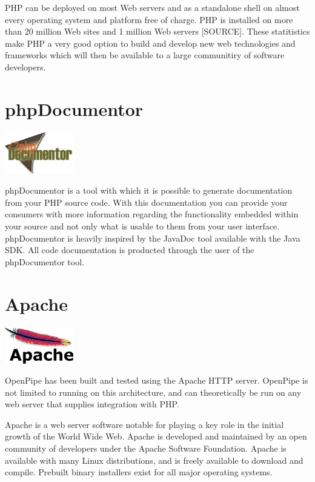 \documentclass[12pt]{report}
\begin{document}
PHP can be deployed on most Web servers and as a standalone shell on almost every operating system and platform free of charge.  PHP is installed on more than 20 million Web sites and 1 million Web servers [SOURCE]. These statitistics make PHP a very good option to build and develop new web technologies and frameworks which will then be available to a large communitiry of software developers.


\section{phpDocumentor}
\begin{center} 
\includegraphics[width=30mm]{figures/images/php_documentor_logo.png}
\end{center}

phpDocumentor is a tool with which it is possible to generate documentation from your PHP source code. With this documentation you can provide your consumers with more information regarding the functionality embedded within your source and not only what is usable to them from your user interface. phpDocumentor is heavily inspired by the JavaDoc tool available with the Java SDK. All code documentation is producted through the user of the phpDocumentor tool.


\section{Apache}
\begin{center} 
\includegraphics[width=30mm]{figures/images/apache_logo.png}
\end{center}

OpenPipe has been built and tested using the Apache HTTP server. OpenPipe is not limited to running on this architecture, and can theoretically be run on any web server that supplies integration with PHP.

Apache is a web server software notable for playing a key role in the initial growth of the World Wide Web. Apache is developed and maintained by an open community of developers under the Apache Software Foundation. Apache is available with many Linux distributions, and is freely available to download and compile. Prebuilt binary installers exist for all major operating systems.  
\end{document}
